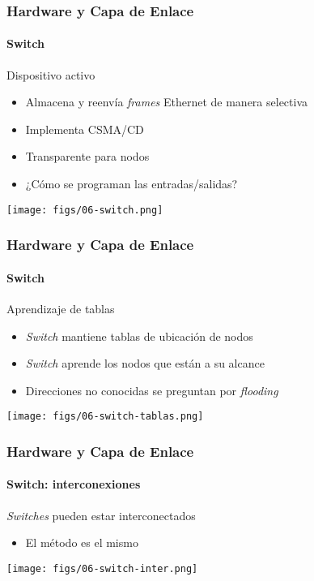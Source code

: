 \documentclass[letter]{beamer}
\begin{document}
\begin{frame}
  \frametitle{Hardware y Capa de Enlace}
  \framesubtitle{Switch}

  Dispositivo activo
  \begin{itemize}
    \item Almacena y reenvía {\em frames} Ethernet de manera selectiva
    \item Implementa CSMA/CD
    \item Transparente para nodos
    \item ¿Cómo se programan las entradas/salidas?
  \end{itemize}

  \begin{center}
    \texttt{[image: figs/06-switch.png]}
  \end{center}


\end{frame}

\begin{frame}
  \frametitle{Hardware y Capa de Enlace}
  \framesubtitle{Switch}

  Aprendizaje de tablas
  \begin{itemize}
    \item {\em Switch} mantiene tablas de ubicación de nodos
    \item {\em Switch} aprende los nodos que están a su alcance
    \item Direcciones no conocidas se preguntan por {\em flooding}
  \end{itemize}

  \begin{center}
    \texttt{[image: figs/06-switch-tablas.png]}
  \end{center}

\end{frame}

\begin{frame}
  \frametitle{Hardware y Capa de Enlace}
  \framesubtitle{Switch: interconexiones}

  {\em Switches} pueden estar interconectados
  \begin{itemize}
    \item El método es el mismo
  \end{itemize}

  \begin{center}
    \texttt{[image: figs/06-switch-inter.png]}
  \end{center}


\end{frame}
\end{document}
